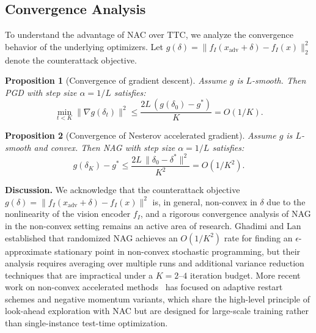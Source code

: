 \documentclass[12pt,a4paper]{article}
\newtheorem{proposition}{Proposition}
\begin{document}
\subsection{Convergence Analysis}

To understand the advantage of NAC over TTC, we analyze the convergence behavior of the underlying optimizers. Let $g(\delta) = \|f_I(x_{\text{adv}} + \delta) - f_I(x)\|^2_2$ denote the counterattack objective.

\begin{proposition}[Convergence of gradient descent]\label{prop:pgd}
Assume $g$ is $L$-smooth. Then PGD with step size $\alpha = 1/L$ satisfies:
\begin{equation}
\min_{t < K} \|\nabla g(\delta_t)\|^2 \leq \frac{2L\,(g(\delta_0) - g^*)}{K} = O(1/K).
\end{equation}
\end{proposition}

\begin{proposition}[Convergence of Nesterov accelerated gradient]\label{prop:nag}
Assume $g$ is $L$-smooth and convex. Then NAG with step size $\alpha = 1/L$ satisfies:
\begin{equation}
g(\delta_K) - g^* \leq \frac{2L\,\|\delta_0 - \delta^*\|^2}{K^2} = O(1/K^2).
\end{equation}
\end{proposition}

\textbf{Discussion.} We acknowledge that the counterattack objective $g(\delta) = \|f_I(x_{\text{adv}} + \delta) - f_I(x)\|^2$ is, in general, non-convex in $\delta$ due to the nonlinearity of the vision encoder $f_I$, and a rigorous convergence analysis of NAG in the non-convex setting remains an active area of research. Ghadimi and Lan~\cite{ghadimi2016accelerated} established that randomized NAG achieves an $O(1/K^2)$ rate for finding an $\epsilon$-approximate stationary point in non-convex stochastic programming, but their analysis requires averaging over multiple runs and additional variance reduction techniques that are impractical under a $K=2$--$4$ iteration budget. More recent work on non-convex accelerated methods~\cite{ghadimi2016accelerated} has focused on adaptive restart schemes and negative momentum variants, which share the high-level principle of look-ahead exploration with NAC but are designed for large-scale training rather than single-instance test-time optimization.
\end{document}
